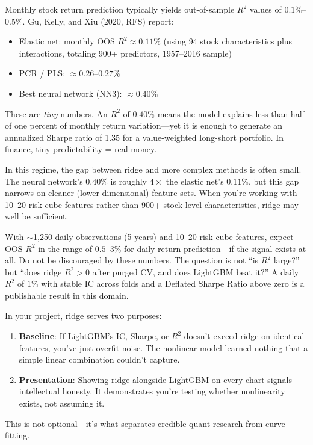 \begin{keyidea}
Monthly stock return prediction typically yields out-of-sample $R^2$ values of $0.1\%$--$0.5\%$.
Gu, Kelly, and Xiu (2020, RFS) report:
\begin{itemize}[nosep]
  \item Elastic net: monthly OOS $R^2 \approx 0.11\%$ (using 94 stock characteristics plus interactions, totaling 900+ predictors, 1957--2016 sample)
  \item PCR / PLS: $\approx 0.26$--$0.27\%$
  \item Best neural network (NN3): $\approx 0.40\%$
\end{itemize}
These are \emph{tiny} numbers.
An $R^2$ of $0.40\%$ means the model explains less than half of one percent of monthly return variation---yet it is enough to generate an annualized Sharpe ratio of 1.35 for a value-weighted long-short portfolio.
In finance, tiny predictability = real money.
\end{keyidea}

In this regime, the gap between ridge and more complex methods is often small.
The neural network's $0.40\%$ is roughly $4\times$ the elastic net's $0.11\%$, but this gap narrows on cleaner (lower-dimensional) feature sets.
When you're working with 10--20 risk-cube features rather than 900+ stock-level characteristics, ridge may well be sufficient.

\begin{projectconnection}
With $\sim$1,250 daily observations (5 years) and 10--20 risk-cube features, expect OOS $R^2$ in the range of $0.5$--$3\%$ for daily return prediction---if the signal exists at all.
Do not be discouraged by these numbers.
The question is not ``is $R^2$ large?'' but ``does ridge $R^2 > 0$ after purged CV, and does LightGBM beat it?''
A daily $R^2$ of $1\%$ with stable IC across folds and a Deflated Sharpe Ratio above zero is a publishable result in this domain.
\end{projectconnection}

\begin{keyidea}
In your project, ridge serves two purposes:
\begin{enumerate}[nosep]
  \item \textbf{Baseline}: If LightGBM's IC, Sharpe, or $R^2$ doesn't exceed ridge on identical features, you've just overfit noise. The nonlinear model learned nothing that a simple linear combination couldn't capture.
  \item \textbf{Presentation}: Showing ridge alongside LightGBM on every chart signals intellectual honesty. It demonstrates you're testing whether nonlinearity exists, not assuming it.
\end{enumerate}
This is not optional---it's what separates credible quant research from curve-fitting.
\end{keyidea}

